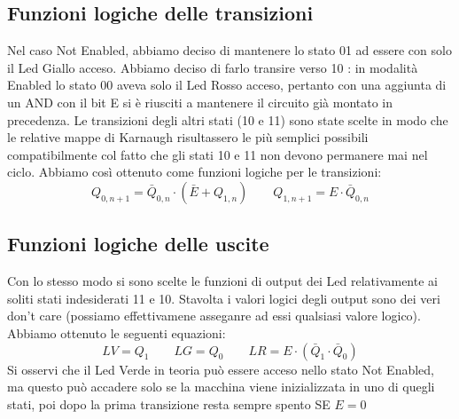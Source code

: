 \documentclass[10pt,a4paper]{article}
\begin{document}
\subsection{Funzioni logiche delle transizioni}
Nel caso Not Enabled, abbiamo deciso di mantenere lo stato 01 ad essere con solo il Led Giallo acceso. Abbiamo deciso di farlo transire verso 10 : in modalità Enabled lo stato 00 aveva solo il Led Rosso acceso, pertanto con una aggiunta di un AND con il bit E si è riusciti a mantenere il circuito già montato in precedenza. Le transizioni degli altri stati (10 e 11) sono state scelte in modo che le relative mappe di Karnaugh risultassero le più semplici possibili compatibilmente col fatto che gli stati 10 e 11 non devono permanere mai nel ciclo.
Abbiamo così ottenuto come funzioni logiche per le transizioni:
\begin{equation}
Q_{0, n+1} = \bar{Q}_{0,n}\cdot(\bar{E}+Q_{1,n})\qquad
Q_{1, n+1} = E\cdot \bar{Q}_{0, n}
\end{equation}
\subsection{Funzioni logiche delle uscite}
Con lo stesso modo si sono scelte le funzioni di output dei Led relativamente ai soliti stati indesiderati 11 e 10. Stavolta i valori logici degli output sono dei veri don't care (possiamo effettivamene asseganre ad essi qualsiasi valore logico). Abbiamo ottenuto le seguenti equazioni:
\begin{equation}
LV = Q_1\qquad LG = Q_0\qquad LR = E\cdot(\bar{Q}_1\cdot\bar{Q}_0)
\end{equation}
Si osservi che il Led Verde in teoria può essere acceso nello stato Not Enabled, ma questo può accadere solo se la macchina viene inizializzata in uno di quegli stati, poi dopo la prima transizione resta sempre spento SE $E=0$%
\end{document}

